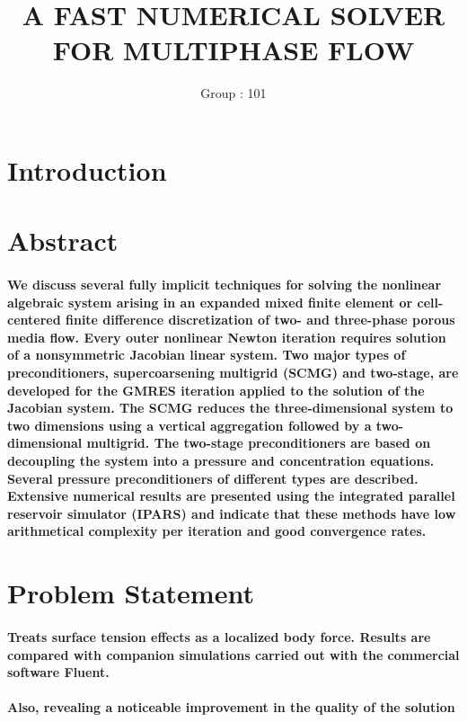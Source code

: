 \documentclass{article}
\begin{document}
		\title{A FAST NUMERICAL SOLVER FOR MULTIPHASE FLOW}
		\author{Group : 101}
		\maketitle
	
		\tableofcontents
	\newpage	

\section{Introduction}
\section{Abstract}
\paragraph{We discuss several fully implicit techniques for solving the nonlinear algebraic system arising in an expanded mixed finite element or cell-centered finite difference discretization of two- and three-phase porous media flow. Every outer nonlinear Newton iteration requires solution of a nonsymmetric Jacobian linear system. Two major types of preconditioners, supercoarsening multigrid (SCMG) and two-stage, are developed for the GMRES iteration applied to the solution of the Jacobian system. The SCMG reduces the three-dimensional system to two dimensions using a vertical aggregation followed by a two-dimensional multigrid. The two-stage preconditioners are based on decoupling the system into a pressure and concentration equations. Several pressure preconditioners of different types are described. Extensive numerical results are presented using the integrated parallel reservoir simulator (IPARS) and indicate that these methods have low arithmetical complexity per iteration and good convergence rates.}
\section{Problem Statement}
	\paragraph{Treats surface tension effects as a localized body force. Results are compared with companion simulations carried 	out with the commercial software Fluent.}
	\paragraph{Also, revealing a noticeable improvement in the quality of the solution}
\end{document}
